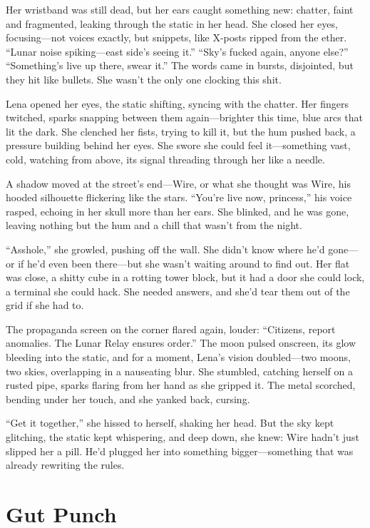 \documentclass[12pt]{book}
\begin{document}
Her wristband was still dead, but her ears caught something new: chatter, faint and fragmented, leaking through the static in her head. She closed her eyes, focusing---not voices exactly, but snippets, like X-posts ripped from the ether. ``Lunar noise spiking---east side’s seeing it.'' ``Sky’s fucked again, anyone else?'' ``Something’s live up there, swear it.'' The words came in bursts, disjointed, but they hit like bullets. She wasn’t the only one clocking this shit.

Lena opened her eyes, the static shifting, syncing with the chatter. Her fingers twitched, sparks snapping between them again---brighter this time, blue arcs that lit the dark. She clenched her fists, trying to kill it, but the hum pushed back, a pressure building behind her eyes. She swore she could feel it---something vast, cold, watching from above, its signal threading through her like a needle.

A shadow moved at the street’s end---Wire, or what she thought was Wire, his hooded silhouette flickering like the stars. ``You're live now, princess,'' his voice rasped, echoing in her skull more than her ears. She blinked, and he was gone, leaving nothing but the hum and a chill that wasn’t from the night.

``Asshole,'' she growled, pushing off the wall. She didn’t know where he’d gone---or if he’d even been there---but she wasn’t waiting around to find out. Her flat was close, a shitty cube in a rotting tower block, but it had a door she could lock, a terminal she could hack. She needed answers, and she’d tear them out of the grid if she had to.

The propaganda screen on the corner flared again, louder: ``Citizens, report anomalies. The Lunar Relay ensures order.'' The moon pulsed onscreen, its glow bleeding into the static, and for a moment, Lena’s vision doubled---two moons, two skies, overlapping in a nauseating blur. She stumbled, catching herself on a rusted pipe, sparks flaring from her hand as she gripped it. The metal scorched, bending under her touch, and she yanked back, cursing.

``Get it together,'' she hissed to herself, shaking her head. But the sky kept glitching, the static kept whispering, and deep down, she knew: Wire hadn’t just slipped her a pill. He’d plugged her into something bigger---something that was already rewriting the rules.

\section{Gut Punch}
\end{document}
